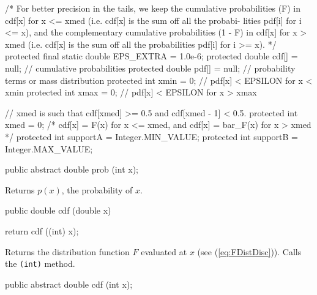 \begin{code}\begin{hide}
  /*
     For better precision in the tails, we keep the cumulative probabilities
     (F) in cdf[x] for x <= xmed (i.e. cdf[x] is the sum off all the probabi-
     lities pdf[i] for i <= x),
     and the complementary cumulative probabilities (1 - F) in cdf[x] for
     x > xmed (i.e. cdf[x] is the sum off all the probabilities pdf[i]
     for i >= x).
  */
   protected final static double EPS_EXTRA = 1.0e-6;
   protected double cdf[] = null;    // cumulative probabilities
   protected double pdf[] = null;    // probability terms or mass distribution
   protected int xmin = 0;           // pdf[x] < EPSILON for x < xmin
   protected int xmax = 0;           // pdf[x] < EPSILON for x > xmax

   // xmed is such that cdf[xmed] >= 0.5 and cdf[xmed - 1] < 0.5.
   protected int xmed = 0;           /* cdf[x] = F(x) for x <= xmed, and
                                        cdf[x] = bar_F(x) for x > xmed */
   protected int supportA = Integer.MIN_VALUE;
   protected int supportB = Integer.MAX_VALUE;
\end{hide}

   public abstract double prob (int x);
\end{code}
\begin{tabb}  Returns $p(x)$, the probability of $x$.
\end{tabb}
\begin{htmlonly}
\end{htmlonly}
\begin{code}

   public double cdf (double x)\begin{hide} {
     return cdf ((int) x);
   }\end{hide}
\end{code}
\begin{tabb}  Returns the distribution function $F$ evaluated at $x$
(see (\ref{eq:FDistDisc})).
  Calls the \texttt{(int)} method.
\end{tabb}
\begin{htmlonly}
\end{htmlonly}
\begin{code}

   public abstract double cdf (int x);
\end{code}
